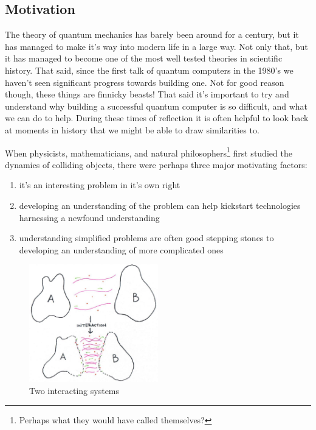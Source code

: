 \documentclass[11pt,english]{article}
\theoremstyle{definition}
\begin{document}
\subsection{Motivation}

The theory of quantum mechanics has barely been around for a century, but it has managed to make it's way into modern life in a large way. Not only that, but it has managed to become one of the most well tested theories in scientific history. That said, since the first talk of quantum computers in the 1980's we haven't seen significant progress towards building one. Not for good reason though, these things are finnicky beasts! That said it's important to try and understand why building a successful quantum computer is so difficult, and what we can do to help. During these times of reflection it is often helpful to look back at moments in history that we might be able to draw similarities to.

When physicists, mathematicians, and natural philosophers\footnote{Perhaps what they would have called themselves?} first studied the dynamics of colliding objects, there were perhaps three major motivating factors:
\begin{enumerate}
	\item it's an interesting problem in it's own right
	\item developing an understanding of the problem can help kickstart technologies harnessing a newfound understanding
	\item understanding simplified problems are often good stepping stones to developing an understanding of more complicated ones
\end{enumerate}

\begin{figure}[h!]
	\begin{center}
		\includegraphics[width=0.5\textwidth]{interaction.jpeg}
		\caption{Two interacting systems}\label{fig:interacting-systems}
	\end{center}
\end{figure}
\end{document}
